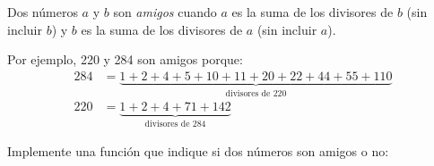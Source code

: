 \documentclass[11pt,spanish,a5paper,landscape]{article}
\begin{document}
  \thispagestyle{empty}

  Dos números \(a\) y \(b\) son \emph{amigos}
  cuando \(a\) es la suma de los divisores de \(b\) (sin incluir \(b\))
  y \(b\) es la suma de los divisores de \(a\) (sin incluir \(a\)).

  Por ejemplo, 220 y 284 son amigos porque:
  \begin{align*}
    284 &= \underbrace{1 + 2 + 4 +  5 +  10 + 11 + 20 + 22 + 44 + 55 + 110}_{\text{divisores de 220}} \\
    220 &= \underbrace{1 + 2 + 4 + 71 + 142}_{\text{divisores de 284}}
  \end{align*}

  Implemente una función que indique si dos números son amigos o no:

  
\end{document}
